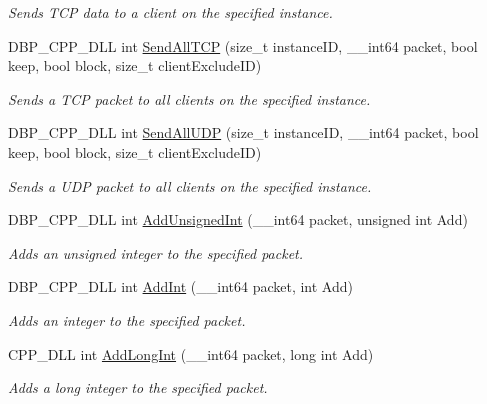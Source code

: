 \begin{DoxyCompactItemize}
\begin{DoxyCompactList}\small\item\em Sends TCP data to a client on the specified instance. \item\end{DoxyCompactList}\item 
DBP\_\-CPP\_\-DLL int \hyperlink{namespacemn_a908c1d799a28850891e7432d7ad08d54}{SendAllTCP} (size\_\-t instanceID, \_\-\_\-int64 packet, bool keep, bool block, size\_\-t clientExcludeID)
\begin{DoxyCompactList}\small\item\em Sends a TCP packet to all clients on the specified instance. \item\end{DoxyCompactList}\item 
DBP\_\-CPP\_\-DLL int \hyperlink{namespacemn_adbcf7335bfdbdcc3a2fbb7e9de792256}{SendAllUDP} (size\_\-t instanceID, \_\-\_\-int64 packet, bool keep, bool block, size\_\-t clientExcludeID)
\begin{DoxyCompactList}\small\item\em Sends a UDP packet to all clients on the specified instance. \item\end{DoxyCompactList}\item 
DBP\_\-CPP\_\-DLL int \hyperlink{namespacemn_a014728aa15cb725505b6062e8abf9142}{AddUnsignedInt} (\_\-\_\-int64 packet, unsigned int Add)
\begin{DoxyCompactList}\small\item\em Adds an unsigned integer to the specified packet. \item\end{DoxyCompactList}\item 
DBP\_\-CPP\_\-DLL int \hyperlink{namespacemn_a55b7a2af579d2a8a49a96dd23ab8b3a3}{AddInt} (\_\-\_\-int64 packet, int Add)
\begin{DoxyCompactList}\small\item\em Adds an integer to the specified packet. \item\end{DoxyCompactList}\item 
CPP\_\-DLL int \hyperlink{namespacemn_a627c50f822de74e537d995c97d7e7157}{AddLongInt} (\_\-\_\-int64 packet, long int Add)
\begin{DoxyCompactList}\small\item\em Adds a long integer to the specified packet. \item\end{DoxyCompactList}\item 

\end{DoxyCompactItemize}
